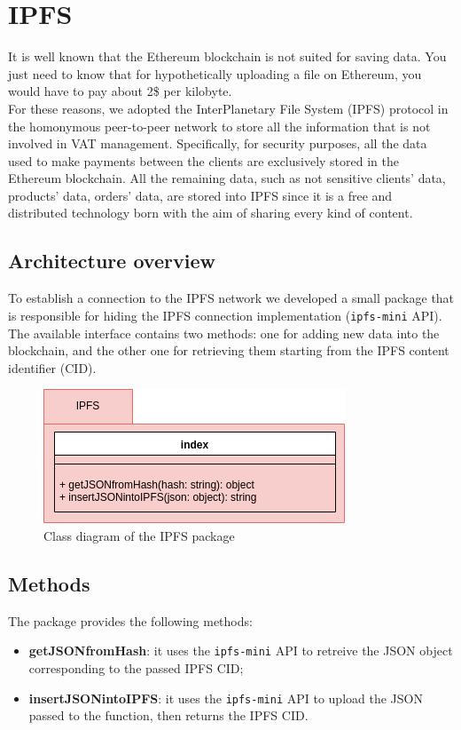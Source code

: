 \section{IPFS} 

It is well known that the Ethereum blockchain is not suited for saving data. You just need to know that for hypothetically uploading a file on Ethereum, you would have to pay about 2\$ per kilobyte. 
\\
For these reasons, we adopted the InterPlanetary File System (IPFS) protocol in the homonymous peer-to-peer network to store all the information that is not involved in VAT management. Specifically, for security purposes, all the data used to make payments between the clients are exclusively stored in the Ethereum blockchain. All the remaining data, such as not sensitive clients' data, products' data, orders' data, are stored into IPFS since it is a free and distributed technology born with the aim of sharing every kind of content.

\subsection{Architecture overview}

To establish a connection to the IPFS network we developed a small package that is responsible for hiding the IPFS connection implementation (\texttt{ipfs-mini} API\glo). The available interface contains two methods: one for adding new data into the blockchain, and the other one for retrieving them starting from the IPFS content identifier (CID).
\begin{figure}[h]
	\centering
	\includegraphics[scale=0.6]{res/images/IPFS.png}
	\caption{Class diagram of the IPFS package}
\end{figure}
\subsection{Methods}
The package provides the following methods:
\begin{itemize}
	\item \textbf{getJSONfromHash}: it uses the \texttt{ipfs-mini} API to retreive the JSON object corresponding to the passed IPFS CID;
	\item \textbf{insertJSONintoIPFS}: it uses the \texttt{ipfs-mini} API to upload the JSON passed to the function, then returns the IPFS CID.
\end{itemize}

